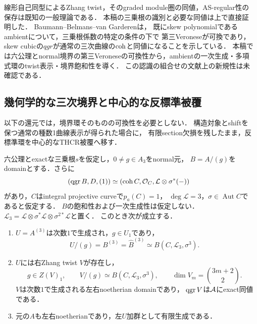 \documentclass[11pt,a4paper]{ltjsarticle}
\begin{document}
\begin{remark}[既知のtwistと本稿の認識の区別]
線形自己同型によるZhang twist，そのgraded module圏の同値，AS-regular性の保存は既知の一般理論である\cite{ZhangTwist}．
本稿の三乗根の識別と必要な同値は上で直接証明した．
Baumann--Belmans--van Garderen\cite[\S6.1, Proposition 50, Lemma 52]{BBvGCentral}は，
既にskew polynomialであるambientについて，三乗根係数の特定の条件の下で
第三Veroneseが可換であり，skew cubicの$qgr$が通常の三次曲線の$\operatorname{coh}$と同値になることを示している．
本稿では六公理とnormal境界の第三Veroneseの可換性から，ambientの一次生成・多項式環のtwist表示・境界飽和性を導く．
この認識の組合せの文献上の新規性は未確認である．
\end{remark}

\subsection{幾何学的な三次境界と中心的な反標準被覆}
\label{subsec:v8-geometric-central-cover}
以下の還元では，境界環そのものの可換性を必要としない．
構造対象とshiftを保つ通常の種数1曲線表示が得られた場合に，
有限section欠損を残したまま，反標準環を中心的なTHCR被覆へ移す．

\begin{proposition}[幾何学的な三次境界からの中心的次数9被覆]
\label{prop:v8-geometric-central-reduction}
六公理とexactな三乗根$s$を仮定し，$0\ne g\in A_3$をnormal元，
$B=A/(g)$をdomainとする．さらに
\[
 (\operatorname{qgr} B,D,(1))\simeq
 (\operatorname{coh} C,\mathcal O_C,\mathcal L\otimes\sigma^*(-))
\]
があり，$C$はintegral projective curveで$p_a(C)=1$，
$\deg\mathcal L=3$，$\sigma\in\operatorname{Aut}C$であると仮定する．
$B$の飽和性および一次生成性は仮定しない．
$\mathcal L_3=\mathcal L\otimes\sigma^*\mathcal L\otimes\sigma^{2*}\mathcal L$と置く．
このとき次が成立する．
\begin{enumerate}[label=(\roman*)]
\item $U=A^{(3)}$は次数$1$で生成され，$g\in U_1$であり，
\[
 U/(g)=B^{(3)}=\widehat B^{(3)}
 \simeq B(C,\mathcal L_3,\sigma^3).
\]
\item $U$には右Zhang twist $V$が存在し，
\[
 g\in Z(V)_1,\qquad V/(g)\simeq B(C,\mathcal L_3,\sigma^3),
 \qquad \dim V_m=\binom{3m+2}{2}.
\]
$V$は次数$1$で生成される左右noetherian domainであり，
$\operatorname{qgr} V$は$\mathcal A$にexact同値である．
\item 元の$A$も左右noetherianであり，左$U$加群として有限生成である．
\end{enumerate}
\end{proposition}
\end{document}
